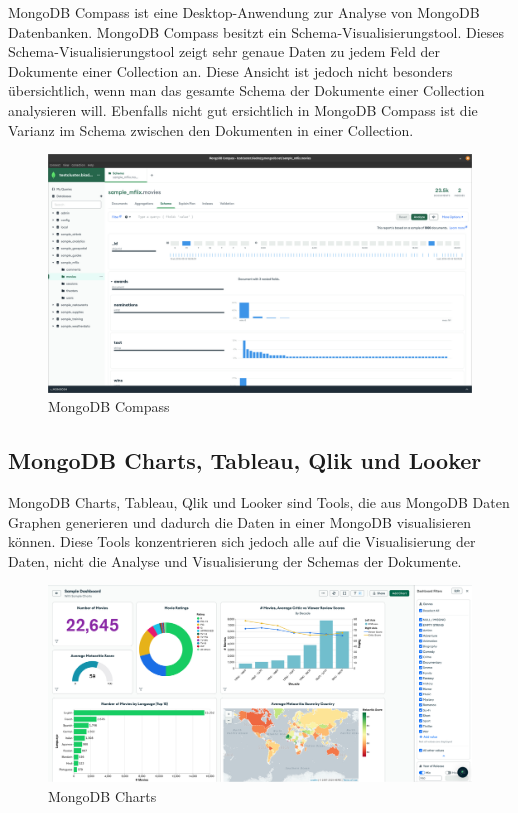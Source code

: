 MongoDB Compass ist eine Desktop-Anwendung zur Analyse von MongoDB Datenbanken.
MongoDB Compass besitzt ein Schema-Visualisierungstool.
Dieses Schema-Visualisierungstool zeigt sehr genaue Daten zu jedem Feld der Dokumente einer Collection an.
Diese Ansicht ist jedoch nicht besonders übersichtlich, wenn man das gesamte Schema der Dokumente einer Collection analysieren will.
Ebenfalls nicht gut ersichtlich in MongoDB Compass ist die Varianz im Schema zwischen den Dokumenten in einer Collection.
\begin{figure}[H]
    \includegraphics[width=\textwidth]{images/mongodb_compass}
    \caption{MongoDB Compass}
    \label{fig:mongodb_compass}
\end{figure}

\subsection{MongoDB Charts, Tableau, Qlik und Looker}
\label{sub:mongodb_charts}

MongoDB Charts, Tableau, Qlik und Looker sind Tools, die aus MongoDB Daten Graphen generieren und dadurch die Daten in einer MongoDB visualisieren können.
Diese Tools konzentrieren sich jedoch alle auf die Visualisierung der Daten, nicht die Analyse und Visualisierung der Schemas der Dokumente.
\begin{figure}[H]
    \includegraphics[width=\textwidth]{images/mongodb_charts}
    \caption{MongoDB Charts}
    \label{fig:mongodb_charts}
\end{figure}

